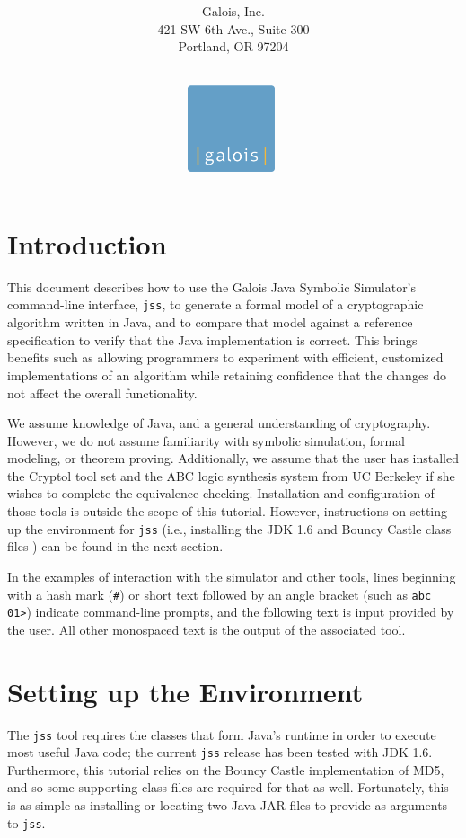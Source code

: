 \documentclass[11pt]{article}
\title{\LARGE{\bf \titleline}}
\author{\\$ $\\$ $\\
        Galois, Inc.\\
        421 SW 6th Ave., Suite 300\\Portland, OR 97204}
\date{
\vspace*{2cm}$ $\\
\includegraphics[height=1in]{images/Galois_logo_blue_box.pdf}
\vspace*{2cm}$ $\\
}
\begin{document}
\maketitle
\thispagestyle{empty}
\newpage

\section{Introduction}

This document describes how to use the Galois Java Symbolic Simulator's
command-line interface, \texttt{jss}, to generate a formal model of a
cryptographic algorithm written in Java, and to compare that model
against a reference specification to verify that the Java implementation
is correct. This brings benefits such as allowing programmers to
experiment with efficient, customized implementations of an algorithm
while retaining confidence that the changes do not affect the overall
functionality.

We assume knowledge of Java, and a general understanding of
cryptography. However, we do not assume familiarity with symbolic
simulation, formal modeling, or theorem proving.  Additionally, we
assume that the user has installed the Cryptol tool set and the ABC
logic synthesis system from UC Berkeley if she wishes to complete the
equivalence checking.  Installation and configuration of those tools is
outside the scope of this tutorial.  However, instructions on setting up
the environment for \texttt{jss} (i.e., installing the JDK 1.6 and
Bouncy Castle class files ) can be found in the next section.

In the examples of interaction with the simulator and other tools, lines
beginning with a hash mark (\texttt{\#}) or short text followed by an
angle bracket (such as \texttt{abc 01>}) indicate command-line prompts,
and the following text is input provided by the user. All other
monospaced text is the output of the associated tool. 

\section{Setting up the Environment}
\label{sec:setup}
 
The \texttt{jss} tool requires the classes that form Java's runtime in
order to execute most useful Java code; the current \texttt{jss} release
has been tested with JDK 1.6.  Furthermore, this tutorial relies on the
Bouncy Castle implementation of MD5, and so some supporting class files
are required for that as well.  Fortunately, this is as simple as
installing or locating two Java JAR files to provide as arguments to
\texttt{jss}.
\end{document}
